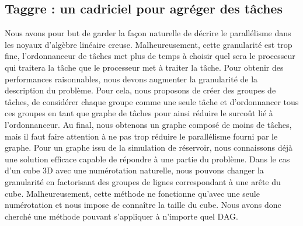 \subsection{Taggre : un cadriciel pour agréger des tâches}
Nous avons pour but de garder la façon naturelle de décrire le parallélisme dans les noyaux d'algèbre linéaire creuse.
%
Malheureusement, cette granularité est trop fine, l'ordonnanceur de tâches met plus de temps à choisir quel sera le processeur qui traitera la tâche que le processeur met à traiter la tâche.
%
Pour obtenir des performances raisonnables, nous devons augmenter la granularité de la description du problème.
%
Pour cela, nous proposons de créer des groupes de tâches, de considérer chaque groupe comme une seule tâche et d'ordonnancer tous ces groupes en tant que graphe de tâches pour ainsi réduire le surcoût lié à l'ordonnanceur.
%
Au final, nous obtenons un graphe composé de moins de tâches, mais il faut faire attention à ne pas trop réduire le parallélisme fourni par le graphe.
%
Pour un graphe issu de la simulation de réservoir, nous connaissons déjà une solution efficace capable de répondre à une partie du problème.
%
Dans le cas d'un cube 3D avec une numérotation naturelle, nous pouvons changer la granularité en factorisant des groupes de lignes correspondant à une arête du cube.
%
Malheureusement, cette méthode ne fonctionne qu'avec une seule numérotation et nous impose de connaître la taille du cube.
%
Nous avons donc cherché une méthode pouvant s'appliquer à n'importe quel DAG.

